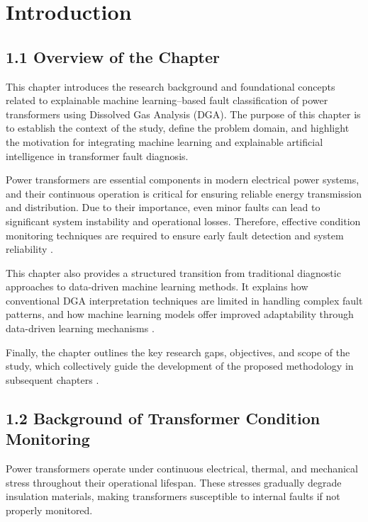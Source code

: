 \chapter{Introduction}

\section{1.1 Overview of the Chapter}

This chapter introduces the research background and foundational concepts related to explainable machine learning–based fault classification of power transformers using Dissolved Gas Analysis (DGA). The purpose of this chapter is to establish the context of the study, define the problem domain, and highlight the motivation for integrating machine learning and explainable artificial intelligence in transformer fault diagnosis.

Power transformers are essential components in modern electrical power systems, and their continuous operation is critical for ensuring reliable energy transmission and distribution. Due to their importance, even minor faults can lead to significant system instability and operational losses. Therefore, effective condition monitoring techniques are required to ensure early fault detection and system reliability \parencite{Wang2023Imbalanced}.

This chapter also provides a structured transition from traditional diagnostic approaches to data-driven machine learning methods. It explains how conventional DGA interpretation techniques are limited in handling complex fault patterns, and how machine learning models offer improved adaptability through data-driven learning mechanisms \parencite{Dladla2025SLR}.

Finally, the chapter outlines the key research gaps, objectives, and scope of the study, which collectively guide the development of the proposed methodology in subsequent chapters \parencite{Cao2024Advancement}.

\section{1.2 Background of Transformer Condition Monitoring}

Power transformers operate under continuous electrical, thermal, and mechanical stress throughout their operational lifespan. These stresses gradually degrade insulation materials, making transformers susceptible to internal faults if not properly monitored.

